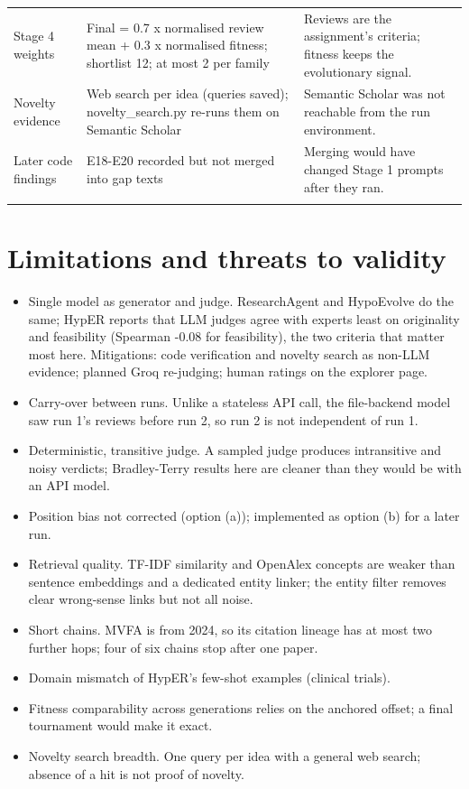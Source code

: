 \documentclass[11pt,a4paper]{article}
\begin{document}
\begin{longtable}{@{}P{3.2cm} P{6.6cm} P{5.8cm}@{}}
Stage 4 weights & Final = 0.7 x normalised review mean + 0.3 x normalised fitness; shortlist 12; at most 2 per family & Reviews are the assignment's criteria; fitness keeps the evolutionary signal.\\\addlinespace[3pt]
Novelty evidence & Web search per idea (queries saved); novelty\_\allowbreak{}search.py re-runs them on Semantic Scholar & Semantic Scholar was not reachable from the run environment.\\\addlinespace[3pt]
Later code findings & E18-E20 recorded but not merged into gap texts & Merging would have changed Stage 1 prompts after they ran.\\\addlinespace[3pt]
\bottomrule\end{longtable}
\section{Limitations and threats to validity}
\begin{itemize}[leftmargin=1.2em]
\item Single model as generator and judge. ResearchAgent and HypoEvolve do the same; HypER reports that LLM judges agree with experts least on originality and feasibility (Spearman -0.08 for feasibility), the two criteria that matter most here. Mitigations: code verification and novelty search as non-LLM evidence; planned Groq re-judging; human ratings on the explorer page.
\item Carry-over between runs. Unlike a stateless API call, the file-backend model saw run 1's reviews before run 2, so run 2 is not independent of run 1.
\item Deterministic, transitive judge. A sampled judge produces intransitive and noisy verdicts; Bradley-Terry results here are cleaner than they would be with an API model.
\item Position bias not corrected (option (a)); implemented as option (b) for a later run.
\item Retrieval quality. TF-IDF similarity and OpenAlex concepts are weaker than sentence embeddings and a dedicated entity linker; the entity filter removes clear wrong-sense links but not all noise.
\item Short chains. MVFA is from 2024, so its citation lineage has at most two further hops; four of six chains stop after one paper.
\item Domain mismatch of HypER's few-shot examples (clinical trials).
\item Fitness comparability across generations relies on the anchored offset; a final tournament would make it exact.
\item Novelty search breadth. One query per idea with a general web search; absence of a hit is not proof of novelty.
\end{itemize}
\end{document}
